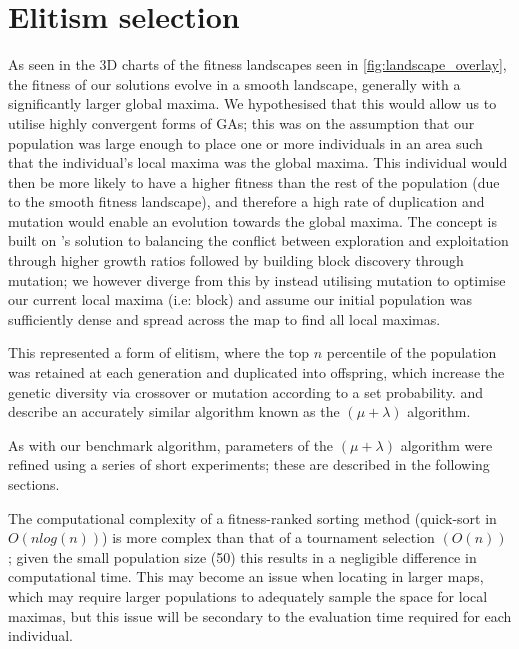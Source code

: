 \documentclass[authoryearcitations]{UoYCSproject}
\begin{document}
\section{Elitism selection}
\label{subsec:elitism_sel}
As seen in the 3D charts of the fitness landscapes seen in \autoref{fig:landscape_overlay}, the fitness of our solutions evolve in a smooth landscape, generally with a significantly larger global maxima. We hypothesised that this would allow us to utilise highly convergent forms of GAs; this was on the assumption that our population was large enough to place one or more individuals in an area such that the individual's local maxima was the global maxima. This individual would then be more likely to have a higher fitness than the rest of the population (due to the smooth fitness landscape), and therefore a high rate of duplication and mutation would enable an evolution towards the global maxima. The concept is built on \citet{David_E_Goldberg1991-es}'s solution to balancing the conflict between exploration and exploitation through higher growth ratios followed by building block discovery through mutation; we however diverge from this by instead utilising mutation to optimise our current local maxima (i.e: block) and assume our initial population was sufficiently dense and spread across the map to find all local maximas. \newline
	
This represented a form of elitism, where the top $n$ percentile of the population was retained at each generation and duplicated into offspring, which increase the genetic diversity via crossover or mutation according to a set probability. \citet{T_Back_D_B_Fogel_T_Michalewicz} and \citet{Shapiro1992-qm} describe an accurately similar algorithm known as the $(\mu + \lambda)$  algorithm. \newline

As with our benchmark algorithm, parameters of the $(\mu + \lambda)$ algorithm were refined using a series of short experiments; these are described in the following sections. \newline

The computational complexity of a fitness-ranked sorting method (quick-sort in $O(n log (n))$) is more complex  \cite{Mitchell1998-td} than that of a tournament selection $(O(n))$ \cite{David_E_Goldberg1991-es}; given the small population size (50) this results in a negligible difference in computational time. This may become an issue when locating in larger maps, which may require larger populations to adequately sample the space for local maximas, but this issue will be secondary to the evaluation time required for each individual.
\end{document}
